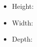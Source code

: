 \documentclass[aspectratio=169]{beamer}
\begin{document}
\begin{frame}
   \begin{itemize}
      \item Height: \the\ht\mybox
      \item Width: \the\wd\mybox
      \item Depth: \the\dp\mybox %
   \end{itemize}
\end{frame}
\end{document}
